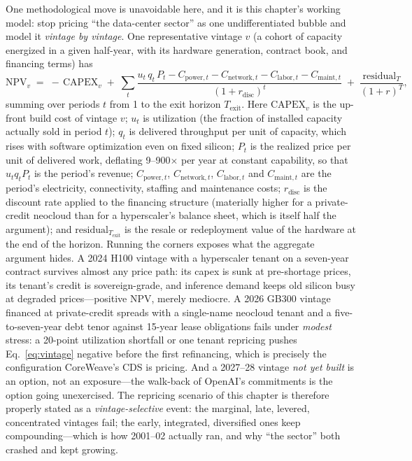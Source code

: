 One methodological move is unavoidable here, and it is this chapter's working model: stop pricing ``the data-center sector'' as one undifferentiated bubble and model it \emph{vintage by vintage}. One representative vintage $v$ (a cohort of capacity energized in a given half-year, with its hardware generation, contract book, and financing terms) has
\begin{equation}
\mathrm{NPV}_v \;=\; -\,\mathrm{CAPEX}_v \;+\; \sum_t \frac{u_t\, q_t\, P_t - C_{\mathrm{power},t} - C_{\mathrm{network},t} - C_{\mathrm{labor},t} - C_{\mathrm{maint},t}}{(1+r_{\mathrm{disc}})^t} \;+\; \frac{\mathrm{residual}_T}{(1+r)^T},
\label{eq:vintage}
\end{equation}
summing over periods $t$ from 1 to the exit horizon $T_{\mathrm{exit}}$. Here $\mathrm{CAPEX}_v$ is the up-front build cost of vintage $v$; $u_t$ is utilization (the fraction of installed capacity actually sold in period $t$); $q_t$ is delivered throughput per unit of capacity, which rises with software optimization even on fixed silicon; $P_t$ is the realized price per unit of delivered work, deflating 9--900$\times$ per year at constant capability, so that $u_t q_t P_t$ is the period's revenue; $C_{\mathrm{power},t}$, $C_{\mathrm{network},t}$, $C_{\mathrm{labor},t}$ and $C_{\mathrm{maint},t}$ are the period's electricity, connectivity, staffing and maintenance costs; $r_{\mathrm{disc}}$ is the discount rate applied to the financing structure (materially higher for a private-credit neocloud than for a hyperscaler's balance sheet, which is itself half the argument); and $\mathrm{residual}_{T_{\mathrm{exit}}}$ is the resale or redeployment value of the hardware at the end of the horizon. Running the corners exposes what the aggregate argument hides. A 2024 H100 vintage with a hyperscaler tenant on a seven-year contract survives almost any price path: its capex is sunk at pre-shortage prices, its tenant's credit is sovereign-grade, and inference demand keeps old silicon busy at degraded prices---positive NPV, merely mediocre. A 2026 GB300 vintage financed at private-credit spreads with a single-name neocloud tenant and a five-to-seven-year debt tenor against 15-year lease obligations fails under \emph{modest} stress: a 20-point utilization shortfall or one tenant repricing pushes Eq.~\eqref{eq:vintage} negative before the first refinancing, which is precisely the configuration CoreWeave's CDS is pricing. And a 2027--28 vintage \emph{not yet built} is an option, not an exposure---the walk-back of OpenAI's commitments is the option going unexercised. The repricing scenario of this chapter is therefore properly stated as a \emph{vintage-selective} event: the marginal, late, levered, concentrated vintages fail; the early, integrated, diversified ones keep compounding---which is how 2001--02 actually ran, and why ``the sector'' both crashed and kept growing.

